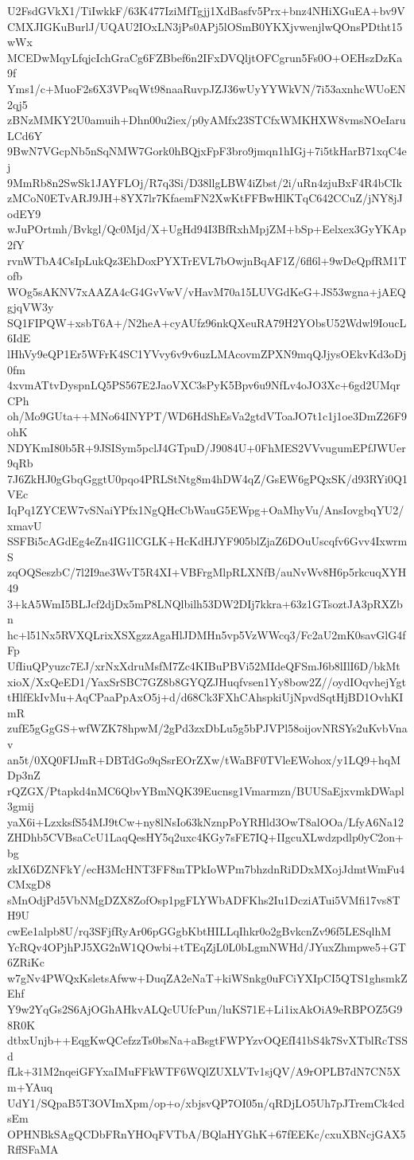 U2FsdGVkX1/TiIwkkF/63K477IziMfTgjj1XdBasfv5Prx+bnz4NHiXGuEA+bv9V
CMXJIGKuBurlJ/UQAU2IOxLN3jPs0APj5lOSmB0YKXjvwenjlwQOnsPDtht15wWx
MCEDwMqyLfqjcIchGraCg6FZBbef6n2IFxDVQljtOFCgrun5Fs0O+OEHszDzKa9f
Yms1/c+MuoF2s6X3VPsqWt98naaRuvpJZJ36wUyYYWkVN/7i53axnhcWUoEN2qj5
zBNzMMKY2U0amuih+Dhn00u2iex/p0yAMfx23STCfxWMKHXW8vmsNOeIaruLCd6Y
9BwN7VGcpNb5nSqNMW7Gork0hBQjxFpF3bro9jmqn1hIGj+7i5tkHarB71xqC4ej
9MmRb8n2SwSk1JAYFLOj/R7q3Si/D38llgLBW4iZbst/2i/uRn4zjuBxF4R4bCIk
zMCoN0ETvARJ9JH+8YX7lr7KfaemFN2XwKtFFBwHlKTqC642CCuZ/jNY8jJodEY9
wJuPOrtmh/Bvkgl/Qc0Mjd/X+UgHd94I3BfRxhMpjZM+bSp+Eelxex3GyYKAp2fY
rvnWTbA4CsIpLukQz3EhDoxPYXTrEVL7bOwjnBqAF1Z/6fl6l+9wDeQpfRM1Tofb
WOg5sAKNV7xAAZA4cG4GvVwV/vHavM70a15LUVGdKeG+JS53wgna+jAEQgjqVW3y
SQ1FIPQW+xsbT6A+/N2heA+cyAUfz96nkQXeuRA79H2YObsU52Wdwl9IoucL6IdE
lHhVy9eQP1Er5WFrK4SC1YVvy6v9v6uzLMAcovmZPXN9mqQJjysOEkvKd3oDj0fm
4xvmATtvDyspnLQ5PS567E2JaoVXC3sPyK5Bpv6u9NfLv4oJO3Xc+6gd2UMqrCPh
oh/Mo9GUta++MNo64INYPT/WD6HdShEsVa2gtdVToaJO7t1c1j1oe3DmZ26F9ohK
NDYKmI80b5R+9JSISym5pclJ4GTpuD/J9084U+0FhMES2VVvugumEPfJWUer9qRb
7J6ZkHJ0gGbqGggtU0pqo4PRLStNtg8m4hDW4qZ/GsEW6gPQxSK/d93RYi0Q1VEc
IqPq1ZYCEW7vSNaiYPfx1NgQHcCbWauG5EWpg+OaMhyVu/AnsIovgbqYU2/xmavU
SSFBi5cAGdEg4eZn4IG1lCGLK+HcKdHJYF905blZjaZ6DOuUscqfv6Gvv4IxwrmS
zqOQSeszbC/7l2I9ae3WvT5R4XI+VBFrgMlpRLXNfB/auNvWv8H6p5rkcuqXYH49
3+kA5WmI5BLJcf2djDx5mP8LNQlbilh53DW2DIj7kkra+63z1GTsoztJA3pRXZbn
hc+l51Nx5RVXQLrixXSXgzzAgaHlJDMHn5vp5VzWWcq3/Fc2aU2mK0savGlG4fFp
UfIiuQPyuzc7EJ/xrNxXdruMsfM7Zc4KIBuPBVi52MIdeQFSmJ6b8lIlI6D/bkMt
xioX/XxQeED1/YaxSrSBC7GZ8b8GYQZJHuqfvsen1Yy8bow2Z//oydIOqvhejYgt
tHlfEkIvMu+AqCPaaPpAxO5j+d/d68Ck3FXhCAhspkiUjNpvdSqtHjBD1OvhKImR
zufE5gGgGS+wfWZK78hpwM/2gPd3zxDbLu5g5bPJVPl58oijovNRSYs2uKvbVnav
an5t/0XQ0FIJmR+DBTdGo9qSsrEOrZXw/tWaBF0TVleEWohox/y1LQ9+hqMDp3nZ
rQZGX/Ptapkd4nMC6QbvYBmNQK39Eucnsg1Vmarmzn/BUUSaEjxvmkDWapl3gmij
yaX6i+LzxksfS54MJ9tCw+ny8lNsIo63kNznpPoYRHld3OwT8alOOa/LfyA6Na12
ZHDhb5CVBsaCcU1LaqQesHY5q2uxc4KGy7sFE7IQ+IIgcuXLwdzpdlp0yC2on+bg
zkIX6DZNFkY/ecH3McHNT3FF8mTPkIoWPm7bhzdnRiDDxMXojJdmtWmFu4CMxgD8
sMnOdjPd5VbNMgDZX8ZofOsp1pgFLYWbADFKhs2Iu1DcziATui5VMfi17vs8TH9U
cwEe1alpb8U/rq3SFjfRyAr06pGGgbKbtHILLqIhkr0o2gBvkcnZv96f5LESqlhM
YcRQv4OPjhPJ5XG2nW1QOwbi+tTEqZjL0L0bLgmNWHd/JYuxZhmpwe5+GT6ZRiKc
w7gNv4PWQxKsletsAfww+DuqZA2eNaT+kiWSnkg0uFCiYXIpCI5QTS1ghsmkZEhf
Y9w2YqGs2S6AjOGhAHkvALQcUUfcPun/luKS71E+Li1ixAkOiA9eRBPOZ5G98R0K
dtbxUnjb++EqgKwQCefzzTs0bsNa+aBsgtFWPYzvOQEfI41bS4k7SvXTblRcTSSd
fLk+31M2nqeiGFYxaIMuFFkWTF6WQlZUXLVTv1sjQV/A9rOPLB7dN7CN5Xm+YAuq
UdY1/SQpaB5T3OVImXpm/op+o/xbjsvQP7OI05n/qRDjLO5Uh7pJTremCk4cdsEm
OPHNBkSAgQCDbFRnYHOqFVTbA/BQlaHYGhK+67fEEKc/cxuXBNcjGAX5RffSFaMA

